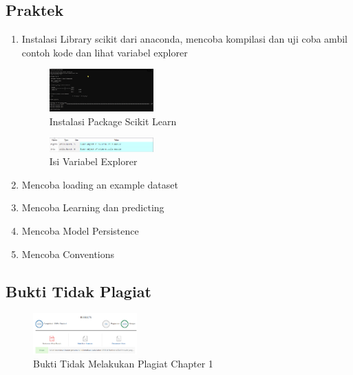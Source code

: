 \subsection{Praktek}
\begin{enumerate}
	\item Instalasi Library scikit dari anaconda, mencoba kompilasi dan uji coba ambil contoh kode dan lihat variabel explorer
	\hfill\break
	\begin{figure}[H]
		\includegraphics[width=4cm]{figures/1174086/1/installasi.PNG}
		\centering
		\caption{Instalasi Package Scikit Learn}
	\end{figure}
	\begin{figure}[H]
		\includegraphics[width=4cm]{figures/1174086/1/variabel.png}
		\centering
		\caption{Isi Variabel Explorer}
	\end{figure}
	\item Mencoba loading an example dataset
	\hfill\break
	
	\item Mencoba Learning dan predicting
	\hfill\break
	
	\item Mencoba Model Persistence
	\hfill\break
	
	\item Mencoba Conventions
	\hfill\break
	
\end{enumerate}

\subsection{Bukti Tidak Plagiat}
\begin{figure}[H]
	\includegraphics[width=4cm]{figures/1174086/bukti/1.png}
	\centering
	\caption{Bukti Tidak Melakukan Plagiat Chapter 1}
\end{figure}

